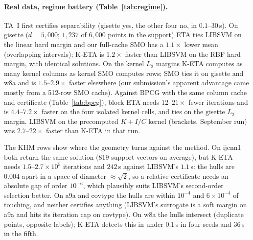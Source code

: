 \documentclass{opt2026}   %
\begin{document}
\paragraph{Real data, regime battery (Table~\ref{tab:regime}).}
TA~I first certifies separability (gisette yes, the other four no, in
$0.1$--$30$\,s). On gisette ($d{=}5{,}000$; $1{,}237$ of $6{,}000$
points in the support) ETA ties LIBSVM on the linear hard margin and our
full-cache SMO has a $1.1\times$ lower mean (overlapping intervals);
K-ETA is $1.2\times$ faster than LIBSVM on the RBF hard margin, with
identical solutions. On the kernel $L_2$ margins K-ETA computes as many
kernel columns as kernel SMO computes rows; SMO ties it on gisette and
w8a and is $1.5$--$2.9\times$ faster elsewhere (our submission's apparent
advantage came mostly from a 512-row SMO cache). Against BPCG \cite{tsuji2022} with the
same column cache and certificate (Table~\ref{tab:bpcg}), block ETA
needs $12$--$21\times$ fewer iterations and is $4.4$--$7.2\times$ faster
on the four isolated kernel cells, and ties on the gisette $L_2$ margin.
LIBSVM on the precomputed $K+I/C$ kernel (brackets, September run) was
$2.7$--$22\times$ faster than K-ETA in that run.

The KHM rows show where the geometry turns against the method. On
ijcnn1 both return the same solution ($819$ support vectors on
average), but
K-ETA needs $1.5$--$2.7\times10^5$ iterations and $242$\,s against
LIBSVM's $1.1$\,s: the hulls are
$0.004$ apart in a space of diameter $\approx\sqrt2$, so a relative
certificate needs an absolute gap of order $10^{-6}$, which plausibly suits LIBSVM's second-order selection better. On a9a and covtype the hulls are within $10^{-4}$ and
$6\times10^{-4}$ of touching, and neither certifies anything (LIBSVM's
surrogate is a soft margin on a9a and hits its iteration cap on covtype). On w8a the hulls intersect (duplicate points, opposite labels);
K-ETA detects this in under $0.1$\,s in four seeds and $36$\,s in
the fifth.
\end{document}
